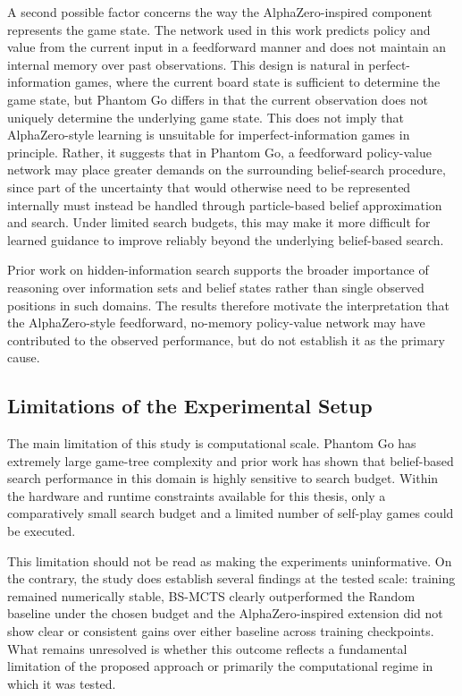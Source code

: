 \documentclass[12pt,oneside,openright]{article}
\begin{document}
A second possible factor concerns the way the AlphaZero-inspired component represents the game state. The network used in this work predicts policy and value from the current input in a feedforward manner and does not maintain an internal memory over past observations. This design is natural in perfect-information games, where the current board state is sufficient to determine the game state, but Phantom Go differs in that the current observation does not uniquely determine the underlying game state. This does not imply that AlphaZero-style learning is unsuitable for imperfect-information games in principle.
Rather, it suggests that in Phantom Go, a feedforward policy-value network may place greater demands on the surrounding belief-search procedure, since part of the uncertainty that would otherwise need to be represented internally must instead be handled through particle-based belief approximation and search.
Under limited search budgets, this may make it more difficult for learned guidance to improve reliably beyond the underlying belief-based search.

Prior work on hidden-information search supports the broader importance of reasoning over information sets and belief states rather than single observed positions in such domains\cite{Wang2015bsmcts}\cite{Cowling2012ismcts}. The results therefore motivate the interpretation that the AlphaZero-style feedforward, no-memory policy-value network may have contributed to the observed performance, but do not establish it as the primary cause.

\subsection{Limitations of the Experimental Setup}

The main limitation of this study is computational scale. Phantom Go has extremely large game-tree complexity and prior work has shown that belief-based search performance in this domain is highly sensitive to search budget\cite{Wang2015bsmcts}. Within the hardware and runtime constraints available for this thesis, only a comparatively small search budget and a limited number of self-play games could be executed.

This limitation should not be read as making the experiments uninformative. On the contrary, the study does establish several findings at the tested scale: training remained numerically stable, BS-MCTS clearly outperformed the Random baseline under the chosen budget and the AlphaZero-inspired extension did not show clear or consistent gains over either baseline across training checkpoints. What remains unresolved is whether this outcome reflects a fundamental limitation of the proposed approach or primarily the computational regime in which it was tested.
\end{document}

